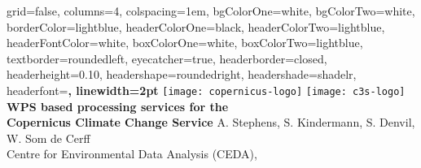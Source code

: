 \documentclass[landscape,a0paper,fontscale=0.4]{baposter} %
\begin{document}


\begin{poster}%
  {
  grid=false,
  columns=4,
  colspacing=1em,
  bgColorOne=white, %
  bgColorTwo=white, %
  borderColor=lightblue, %
  headerColorOne=black, %
  headerColorTwo=lightblue, %
  headerFontColor=white, %
  boxColorOne=white, %
  boxColorTwo=lightblue,
  textborder=roundedleft,
  eyecatcher=true, %
  headerborder=closed, %
  headerheight=0.10\textheight, %
  headershape=roundedright, %
  headershade=shadelr,
  headerfont=\Large\bf\textsc, %
  linewidth=2pt
  }
  {
      \texttt{[image: copernicus-logo]}
      \texttt{[image: c3s-logo]}
  }
  {\sf\bf WPS based processing services for the\\
          Copernicus Climate Change Service
  }
  {
    \vspace{1em} A. Stephens, S. Kindermann, S. Denvil, W. Som de Cerff\\
    {\smaller Centre for Environmental Data Analysis (CEDA),
}}
\end{poster}
\end{document}

